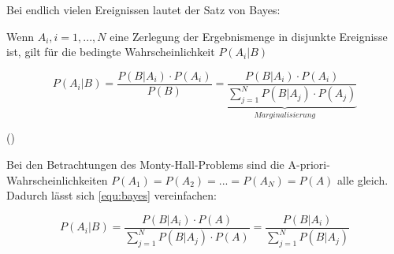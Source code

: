 Bei endlich vielen Ereignissen lautet der Satz von Bayes:

Wenn $A_i, i = 1,..., N$ eine Zerlegung der Ergebnismenge in disjunkte Ereignisse ist, gilt für die bedingte Wahrscheinlichkeit $P(A_i | B)$

\begin{equation} \label{equ:bayes}
    P(A_i | B) = \frac{P(B | A_i) \cdot P(A_i)}{P(B)} \underbrace{= \frac{P(B | A_i) \cdot P(A_i)}{\sum_{j = 1}^{N} P(B | A_j) \cdot P(A_j)}}_{Marginalisierung}
\end{equation}

(\cite[S.406f]{Papula:2014})

Bei den Betrachtungen des Monty-Hall-Problems sind die A-priori-Wahrscheinlichkeiten $P(A_1) = P(A_2) = ... = P(A_N) = P(A)$ alle gleich. Dadurch lässt sich \autoref{equ:bayes} vereinfachen:

\begin{equation} \label{equ:bayes_simpl}
    P(A_i | B)  = \frac{P(B | A_i) \cdot P(A)}{\sum_{j=1}^{N} P(B | A_j) \cdot P(A)}  = \frac{P(B|A_i)}{\sum_{j=1}^{N} P(B | A_j)}
\end{equation}
